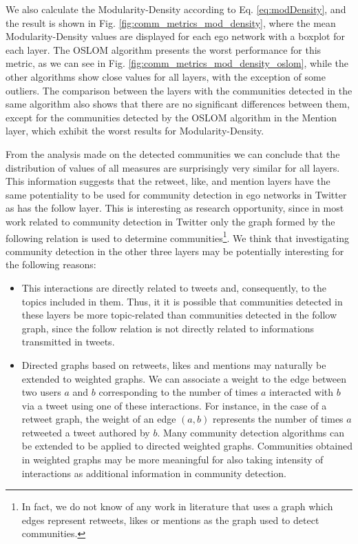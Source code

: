 We also calculate the Modularity-Density according to Eq. \ref{eq:modDensity}, and the result is shown in Fig. \ref{fig:comm_metrics_mod_density}, where the mean Modularity-Density values are displayed for each ego network with a boxplot for each layer. The OSLOM algorithm presents the worst performance for this metric, as we can see in Fig. \ref{fig:comm_metrics_mod_density_oslom}, while the other algorithms show close values for all layers, with the exception of some outliers. The comparison between the layers with the communities detected in the same algorithm also shows that there are no significant differences between them, except for the communities detected by the OSLOM algorithm in the Mention layer, which exhibit the worst results for Modularity-Density.

From the analysis made on the detected communities we can conclude that the distribution of values of all measures are surprisingly very similar for all layers. This information suggests that  the retweet, like, and mention layers have the same potentiality to be used for community detection in ego networks in Twitter as has the follow layer. This is interesting as research opportunity, since in most work related to community detection in Twitter only the graph formed by the following relation is used to determine communities\footnote{In fact, we do not know of any work in literature that uses a graph which edges represent retweets, likes or mentions as the graph used to detect communities.}. We think that investigating community detection in the other three layers may be potentially interesting for the following reasons:
\begin{itemize}
    \item This interactions are directly related to tweets and, consequently, to the topics included in them. Thus, it it is possible that communities detected in these layers  be more topic-related than communities detected in the follow graph, since the follow relation is not directly related to informations transmitted in tweets.
    \item Directed graphs based on retweets, likes and mentions may naturally be extended to weighted graphs. We can associate a  weight to the edge between two users $a$ and $b$ corresponding to the number of times $a$ interacted with $b$ via a tweet using one of these interactions. For instance, in the case of a retweet graph, the weight of an edge $(a,b)$ represents the number of times $a$ retweeted a tweet authored by $b$. Many  community detection algorithms  can be extended to be applied  to  directed weighted graphs. Communities obtained  in weighted graphs may be more meaningful for  also taking intensity of interactions as additional information in community detection.
\end{itemize}


